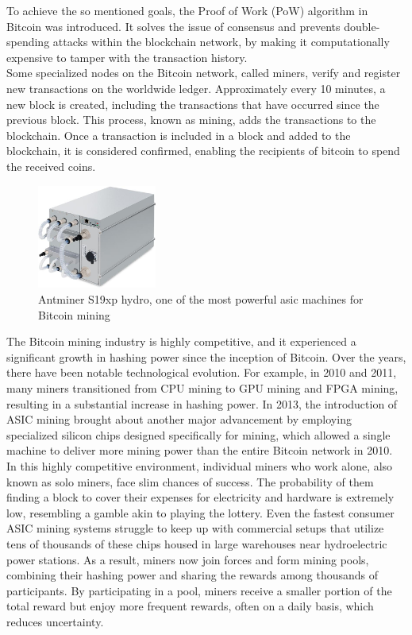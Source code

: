 To achieve the so mentioned goals, the Proof of Work (PoW) algorithm in Bitcoin was introduced. It solves the issue of consensus and prevents double-spending attacks within the blockchain network, by making it computationally expensive to tamper with the transaction history. \\
Some specialized nodes on the Bitcoin network, called miners, verify and register new transactions on the worldwide ledger. Approximately every 10 minutes, a new block is created, including the transactions that have occurred since the previous block. This process, known as mining, adds the transactions to the blockchain. Once a transaction is included in a block and added to the blockchain, it is considered confirmed, enabling the recipients of bitcoin to spend the received coins.
\begin{figure}
\centering
\includegraphics[width=0.35\textwidth]{Figures/bitcoin/s19xp.jpg}
\caption{Antminer S19xp hydro, one of the most powerful asic machines for Bitcoin mining}
\label{fig:antminer}
\end{figure}
The Bitcoin mining industry is highly competitive, and it experienced a significant growth in hashing power since the inception of Bitcoin. Over the years, there have been notable technological evolution. For example, in 2010 and 2011, many miners transitioned from CPU mining to GPU mining and FPGA mining, resulting in a substantial increase in hashing power. In 2013, the introduction of ASIC mining brought about another major advancement by employing specialized silicon chips designed specifically for mining, which allowed a single machine to deliver more mining power than the entire Bitcoin network in 2010.\\
In this highly competitive environment, individual miners who work alone, also known as solo miners, face slim chances of success. The probability of them finding a block to cover their expenses for electricity and hardware is extremely low, resembling a gamble akin to playing the lottery. Even the fastest consumer ASIC mining systems struggle to keep up with commercial setups that utilize tens of thousands of these chips housed in large warehouses near hydroelectric power stations. As a result, miners now join forces and form mining pools, combining their hashing power and sharing the rewards among thousands of participants. By participating in a pool, miners receive a smaller portion of the total reward but enjoy more frequent rewards, often on a daily basis, which reduces uncertainty.\\
